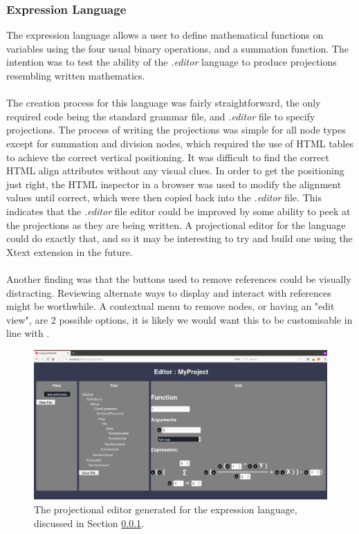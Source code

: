 \documentclass{article}
\begin{document}
{\subsubsection{Expression Language}\label{expressionLang}
The expression language allows a user to define mathematical functions on variables using the four usual binary operations, and a summation function. The intention was to test the ability of the \emph{.editor} language to produce projections resembling written mathematics.
\\
\\
The creation process for this language was fairly straightforward, the only required code being the standard grammar file, and \emph{.editor} file to specify projections. The process of writing the projections was simple for all node types except for summation and division nodes, which required the use of HTML tables to achieve the correct vertical positioning. It was difficult to find the correct HTML align attributes without any visual clues. In order to get the positioning just right, the HTML inspector in a browser was used to modify the alignment values until correct, which were then copied back into the \emph{.editor} file. This indicates that the \emph{.editor} file editor could be improved by some ability to peek at the projections as they are being written. A projectional editor for the language could do exactly that, and so it may be interesting to try and build one using the Xtext extension in the future.   
\\
\\
Another finding was that the buttons used to remove references could be visually distracting. Reviewing alternate ways to display and interact with references might be worthwhile. A contextual menu to remove nodes, or having an "edit view", are 2 possible options, it is likely we would want this to be customisable in line with \RCustom.
\begin{figure}[h!]
  \centering
  \includegraphics[width=\linewidth]{./Screenshots/arithmeticUI3.png}
  \caption{The projectional editor generated for the expression language, discussed in Section \ref{expressionLang}.}
  \label{fig:arithmeticUI}
\end{figure}


}
\end{document}
